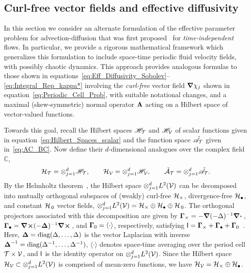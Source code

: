\documentclass[amsa]{ipart}
\begin{document}
\subsection{Curl-free vector fields and effective diffusivity}
\label{app:Curl_Free_Fields}
%
In this section we consider an alternate formulation of the effective
parameter problem for advection-diffusion that was first
proposed~\cite{Avellaneda:PRL-753,Avellaneda:CMP-339} for
\emph{time-independent} flows. In particular, we provide a rigorous
mathematical framework 
which generalizes this formulation to include space-time periodic fluid
velocity fields, with possibly chaotic dynamics.  This approach
provides analogous formulas to those shown in
equations~\eqref{eq:Eff_Diffusivity_Sobolev}--\eqref{eq:Integral_Rep_kappa*}
involving the \emph{curl-free} vector field $\mbox{\boldmath${\nabla}$}\chi_j$ shown in 
equation~\eqref{eq:Periodic_Cell_Prob}, with suitable notational
changes, and a maximal (skew-symmetric) 
normal operator $\mathbf{A}$ acting on a Hilbert space of vector-valued
functions.   







Towards this goal, recall the Hilbert spaces $\mathscr{H}_{\mathcal{T}}$ and
$\mathscr{H}_{\mathcal{V}}$ of scalar functions given in
equation~\eqref{eq:Hilbert_Spaces_scalar} and the function space 
$\tilde{\mathscr{A}}_{\mathcal{T}}$ given in~\eqref{eq:AC_BC}.
Now define
their $d$-dimensional analogues over the complex field $\mathbb{C}$,  
%
\begin{align}\label{eq:Hilbert_Spaces_vector}
  \Hc_{\Tc}=\otimes_{j=1}^d\Hs_{\Tc}, \qquad
  \Hc_{\Vc}=\otimes_{j=1}^d\Hs_{\Vc}, \qquad
  \tilde{\Ac}_{\Tc}=\otimes_{j=1}^d\tilde{\As}_{\Tc}.  
\end{align}
%
By the Helmholtz
theorem~\cite{Denaro:2003:0271,Bhatia:IEE:1077,Fannjiang:1994:SIAM_JAM:333},
the 
Hilbert space $\otimes_{j=1}^dL^2(\mathcal{V})$ can be decomposed into mutually
orthogonal subspaces of (weakly) curl-free $\mathcal{H}_\times$, divergence-free
$\mathcal{H}_\bullet$, and constant $\mathcal{H}_{\,0}$ vector fields,
$\otimes_{j=1}^dL^2(\mathcal{V})=\mathcal{H}_\times\oplus\mathcal{H}_\bullet\oplus\mathcal{H}_{\,0}$. The orthogonal projectors
associated with this decomposition are given by
$\mbox{\boldmath${\Gamma}$}_\times=-\mbox{\boldmath${\nabla}$}(-\Delta)^{-1}\mbox{\boldmath${\nabla}$} \mbox{\boldmath${\cdot}$}\,$,
$\mbox{\boldmath${\Gamma}$}_\bullet=\mbox{\boldmath${\nabla}$}\mbox{\boldmath${\times}$}(-\mbox{\boldmath${\Delta}$})^{-1}\mbox{\boldmath${\nabla}$} \mbox{\boldmath${\times}$}\,$, and 
$\mbox{\boldmath${\Gamma}$}_0=\langle\cdot\rangle$,  respectively, satisfying
$\mathsf{I}=\mbox{\boldmath${\Gamma}$}_\times+\mbox{\boldmath${\Gamma}$}_\bullet+\mbox{\boldmath${\Gamma}$}_0$~\cite{Fannjiang:1994:SIAM_JAM:333,Novikov:2005:CPAM:867,Milton:2002:TC}. Here, 
$\mbox{\boldmath${\Delta}$}=\text{diag}(\Delta,\ldots,\Delta)$ is the vector Laplacian with inverse
$\mbox{\boldmath${\Delta}$}^{-1}=\text{diag}(\Delta^{-1},\ldots,\Delta^{-1})$, $\langle\cdot\rangle$ denotes space-time
averaging over the period cell $\mathcal{T}\times\mathcal{V}$, and $\mathsf{I}$ is the identity
operator on $\otimes_{j=1}^dL^2(\mathcal{V})$. Since the Hilbert space
$\mathcal{H}_{\mathcal{V}}\subset\otimes_{j=1}^dL^2(\mathcal{V})$ is comprised of mean-zero functions, we have
$\mathcal{H}_{\mathcal{V}}=\mathcal{H}_\times\oplus\mathcal{H}_\bullet$. 
\end{document}
